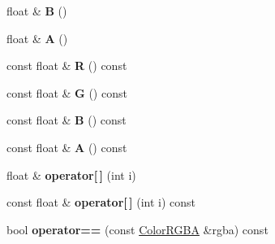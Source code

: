 \begin{DoxyCompactItemize}
\item 
float \& {\bfseries B} ()\hypertarget{class_i_dream_sky_1_1_color_r_g_b_a_a14f487331ae6d9defed70d741f8630a7}{}\label{class_i_dream_sky_1_1_color_r_g_b_a_a14f487331ae6d9defed70d741f8630a7}

\item 
float \& {\bfseries A} ()\hypertarget{class_i_dream_sky_1_1_color_r_g_b_a_a8de45d5324d321fbf50a012b7d2e12b9}{}\label{class_i_dream_sky_1_1_color_r_g_b_a_a8de45d5324d321fbf50a012b7d2e12b9}

\item 
const float \& {\bfseries R} () const \hypertarget{class_i_dream_sky_1_1_color_r_g_b_a_aec3a02b9684605eae9dd07f6a8ab7d9e}{}\label{class_i_dream_sky_1_1_color_r_g_b_a_aec3a02b9684605eae9dd07f6a8ab7d9e}

\item 
const float \& {\bfseries G} () const \hypertarget{class_i_dream_sky_1_1_color_r_g_b_a_a201bae98d4d6e23f08cc3ea60da80998}{}\label{class_i_dream_sky_1_1_color_r_g_b_a_a201bae98d4d6e23f08cc3ea60da80998}

\item 
const float \& {\bfseries B} () const \hypertarget{class_i_dream_sky_1_1_color_r_g_b_a_af371d9c0c9a27b4eb0990f177ae130bd}{}\label{class_i_dream_sky_1_1_color_r_g_b_a_af371d9c0c9a27b4eb0990f177ae130bd}

\item 
const float \& {\bfseries A} () const \hypertarget{class_i_dream_sky_1_1_color_r_g_b_a_a2a3836c8726d60de5a5216e76201a78c}{}\label{class_i_dream_sky_1_1_color_r_g_b_a_a2a3836c8726d60de5a5216e76201a78c}

\item 
float \& {\bfseries operator\mbox{[}$\,$\mbox{]}} (int i)\hypertarget{class_i_dream_sky_1_1_color_r_g_b_a_a5e4ceffff25251c56354487a9abf9bf6}{}\label{class_i_dream_sky_1_1_color_r_g_b_a_a5e4ceffff25251c56354487a9abf9bf6}

\item 
const float \& {\bfseries operator\mbox{[}$\,$\mbox{]}} (int i) const \hypertarget{class_i_dream_sky_1_1_color_r_g_b_a_aeb81640a2270895c7307c1f209c6b4b1}{}\label{class_i_dream_sky_1_1_color_r_g_b_a_aeb81640a2270895c7307c1f209c6b4b1}

\item 
bool {\bfseries operator==} (const \hyperlink{class_i_dream_sky_1_1_color_r_g_b_a}{Color\+R\+G\+BA} \&rgba) const \hypertarget{class_i_dream_sky_1_1_color_r_g_b_a_ad4c8764938b1b6cf31bb48416b7dd903}{}\label{class_i_dream_sky_1_1_color_r_g_b_a_ad4c8764938b1b6cf31bb48416b7dd903}


\end{DoxyCompactItemize}
